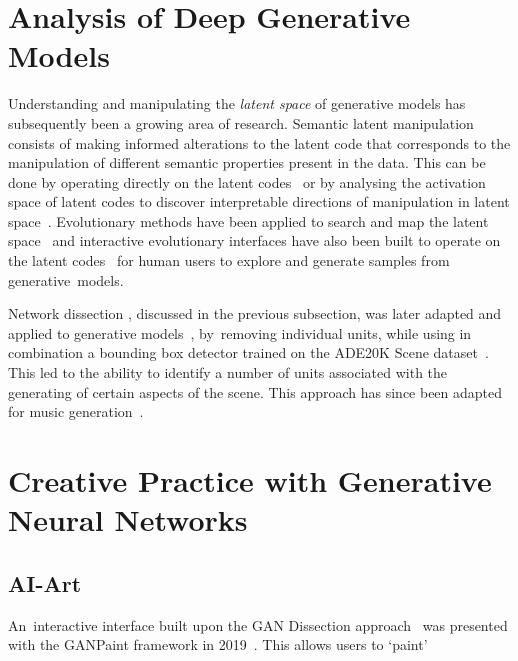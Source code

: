 

\section{Analysis of Deep Generative Models} 

Understanding and manipulating the \emph{latent space} of generative models has subsequently been a growing area of research. 
Semantic latent manipulation consists of making informed alterations to the latent code that corresponds to the manipulation of different semantic properties present in the data. 
This can be done by operating directly on the latent codes~\citep{brock2016neural, shen2020interpreting} or by analysing the activation space of latent codes to discover interpretable directions of manipulation in latent space~\citep{harkonen2020ganspace}. 
Evolutionary methods have been applied to search and map the latent space~\citep{bontrager2018deepmasterprints, fernandes2020evolutionary} and interactive evolutionary interfaces have also been built to operate on the latent codes~\citep{Simon-ganbreeder} for human users to explore and generate samples from generative~models. 

Network dissection \citep{Bau2018-td}, discussed in the previous subsection, was later adapted and applied to generative models~\citep{Bau2018-td}, by~removing individual units, while using in combination a bounding box detector trained on the ADE20K Scene dataset~\citep{zhou2017scene}. 
This led to the ability to identify a number of units associated with the generating of certain aspects of the scene. 
This approach has since been adapted for music generation~\citep{Brink2019-gc}. 

\section{Creative Practice with Generative Neural Networks}

\subsection{AI-Art} 

An~interactive interface built upon the GAN Dissection approach~\citep{Bau2018-td} was presented with the GANPaint framework in 2019~\citep{bau2019semantic}. 
This allows users to `paint'

